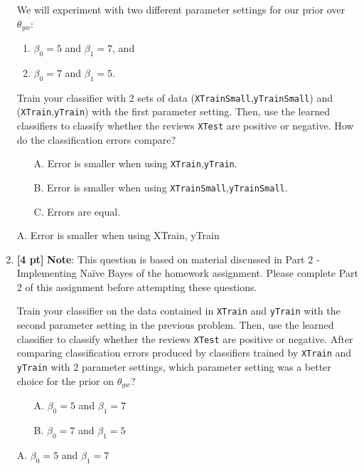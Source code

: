 \documentclass{article}
\begin{document}
\begin{enumerate}
    We will experiment with two different parameter settings for our prior over $\theta_{yw}$: 
    \begin{enumerate}
        \item $\beta_0=5$ and $\beta_1=7$, and 
        \item $\beta_0=7$ and $\beta_1=5$.
    \end{enumerate}
    Train your classifier with 2 sets of data (\texttt{XTrainSmall},\texttt{yTrainSmall}) and (\texttt{XTrain},\texttt{yTrain}) with the first parameter setting. Then, use the learned classifiers to classify whether the reviews \texttt{XTest} are positive or negative. How do the classification errors compare?
    \begin{itemize}
        \item[A.] Error is smaller when using \texttt{XTrain},\texttt{yTrain}.
        \item[B.] Error is smaller when using \texttt{XTrainSmall},\texttt{yTrainSmall}.
        \item[C.] Errors are equal.
    \end{itemize}
    \begin{tcolorbox}[width=\linewidth/3,height=1.5cm]
    A. Error	 is smaller when using XTrain, yTrain
    \end{tcolorbox}
    \newpage
    \item \textbf{[4 pt]} \textbf{Note}: This question is based on material discussed in Part 2 - Implementing Na{\"i}ve Bayes of the homework assignment. Please complete Part 2 of this assignment before attempting these questions.
    
    Train your classifier on the data contained in
    \texttt{XTrain} and \texttt{yTrain} with the second parameter setting in the previous problem. Then, use the learned classifier to classify whether the reviews \texttt{XTest} are positive or negative. After comparing classification errors produced by classifiers trained by \texttt{XTrain} and \texttt{yTrain} with 2 parameter settings, which parameter setting was a better choice for the prior on $\theta_{yw}$?
    \begin{itemize}
        \item[A.] $\beta_0=5$ and $\beta_1=7$
        \item[B.] $\beta_0=7$ and $\beta_1=5$
    \end{itemize}
    \begin{tcolorbox}[width=\linewidth/3,height=1.5cm]
    A. $\beta_0=5$ and $\beta_1=7$
    \end{tcolorbox}
    

\end{enumerate}
\end{document}
